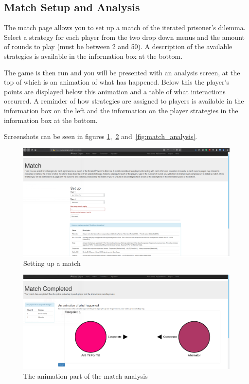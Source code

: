 \documentclass[]{final_report}
\begin{document}
\subsection{Match Setup and Analysis}
The match page allows you to set up a match of the iterated prisoner's dilemma. Select a strategy for each player from the two drop down menus and the amount of rounds to play (must be between 2 and 50). A description of the available strategies is available in the information box at the bottom.\par 
The game is then run and you will be presented with an analysis screen, at the top of which is an animation of what has happened. Below this the player's points are displayed below this animation and a table of what interactions occurred. A reminder of how strategies are assigned to players is available in the information box on the left and the information on the player strategies in the information box at the bottom.\par 
Screenshots can be seen in figures \ref{fig:match_setup},~\ref{fig:match_anim} and~\ref{fig:match_analysis}.
\begin{figure}
	\includegraphics[width=\textwidth]{MatchSetup.png}
	\caption{Setting up a match}
	\label{fig:match_setup}
\end{figure}
\begin{figure}
	\includegraphics[width=\textwidth]{MatchAnim.png}
	\caption{The animation part of the match analysis}
	\label{fig:match_anim}
\end{figure}
\end{document}
